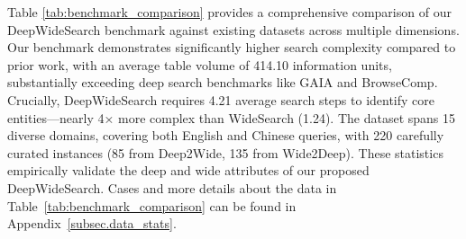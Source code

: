 \documentclass[11pt, letterpaper, logo, onecolumn, copyright, numbering]{paper_improved}
\begin{document}
Table \ref{tab:benchmark_comparison} provides a comprehensive comparison of our DeepWideSearch benchmark against existing datasets across multiple dimensions. Our benchmark demonstrates significantly higher search complexity compared to prior work, with an average table volume of 414.10 information units, substantially exceeding deep search benchmarks like GAIA and BrowseComp. Crucially, DeepWideSearch requires 4.21 average search steps to identify core entities—nearly 4× more complex than WideSearch (1.24). The dataset spans 15 diverse domains, covering both English and Chinese queries, with 220 carefully curated instances (85 from Deep2Wide, 135 from Wide2Deep). 
These statistics empirically validate the deep and wide attributes of our proposed DeepWideSearch. Cases and more details about the data in Table~\ref{tab:benchmark_comparison} can be found in Appendix~\ref{subsec.data_stats}.

\end{document}
